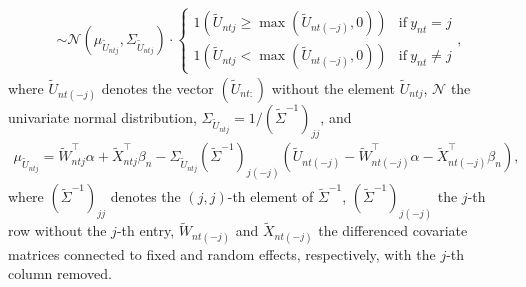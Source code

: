 \documentclass[article,shortnames]{jss}
\begin{document}
\begin{itemize}
\begin{align*}
  \sim \mathcal{N}(\mu_{\tilde{U}_{ntj}},\Sigma_{\tilde{U}_{ntj}}) \cdot \begin{cases}
  1(\tilde{U}_{ntj} \geq \max(\tilde{U}_{nt(-j)},0) ) & \text{if}~ y_{nt}=j\\
  1(\tilde{U}_{ntj} < \max(\tilde{U}_{nt(-j)},0) ) & \text{if}~ y_{nt}\neq j
  \end{cases},
  \end{align*}
  where $\tilde{U}_{nt(-j)}$ denotes the vector $(\tilde{U}_{nt:})$ without the element $\tilde{U}_{ntj}$, $\mathcal{N}$ the univariate normal distribution, $\Sigma_{\tilde{U}_{ntj}} = 1/(\tilde{\Sigma}^{-1})_{jj}$, and
  \begin{align*}
  \mu_{\tilde{U}_{ntj}} = \tilde{W}_{ntj}^\top \alpha + \tilde{X}_{ntj}^\top \beta_n - \Sigma_{\tilde{U}_{ntj}} (\tilde{\Sigma}^{-1})_{j(-j)}   (\tilde{U}_{nt(-j)} - \tilde{W}_{nt(-j)}^\top \alpha - \tilde{X}_{nt(-j)}^\top \beta_n ),
  \end{align*}
  where $(\tilde{\Sigma}^{-1})_{jj}$ denotes the $(j,j)$-th element of $\tilde{\Sigma}^{-1}$, $(\tilde{\Sigma}^{-1})_{j(-j)}$ the $j$-th row without the $j$-th entry, $\tilde{W}_{nt(-j)}$ and $\tilde{X}_{nt(-j)}$ the differenced covariate matrices connected to fixed and random effects, respectively, with the $j$-th column removed.


\end{itemize}
\end{document}
